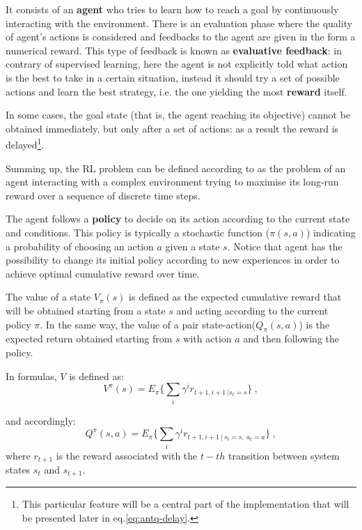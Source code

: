 \documentclass[10pt]{article}
\begin{document}
It consists of an  \textbf{agent}  who tries to learn how to reach a goal by continuously interacting with  the environment. 
There is an evaluation phase where the quality of agent's actions is considered and feedbacks to the agent are given in the form a numerical reward. 
This type of feedback is known as \textbf{evaluative feedback}: in contrary of supervised learning, here the agent is not explicitly told what action is the best to take in a  certain  situation, instead it should try a set of possible actions and learn the best strategy, i.e. the one yielding the most \textbf{reward} itself.  

In some cases, the goal state (that is, the agent reaching its objective) cannot be obtained immediately, but only after a set of actions: as a result the reward is delayed\footnote{This particular feature will be a central part of the implementation that will be presented later in eq.\ref{eq:antq-delay}.}. 

Summing up, the  RL  problem  can  be  defined according to \cite{diciotto} as  the  problem  of  an agent  interacting  with  a  complex environment trying to maximise its long-run reward over a sequence of discrete time steps.

The agent follows a \textbf{policy} to decide on its action according to the current state and conditions. 
This policy is typically a  stochastic  function ($\pi(s,a)$) indicating a probability  of  choosing an action $a$ given a state $s$.
Notice that agent has the possibility to change its initial policy  according  to  new experiences  in order to  achieve  optimal cumulative  reward  over  time.  

The  value  of  a  state $V_\pi(s)$  is  defined  as  the  expected  cumulative reward that  will  be  obtained starting from a state $s$ and acting according to the current policy $\pi$. 
In the same way, the value of  a pair state-action($Q_\pi(s,a)$) is  the  expected  return  obtained starting  from  $s$  with  action $a$  and  then following  the policy. 

In formulas, $V$ is defined as:
\begin{equation}
V^\pi(s)=E_\pi \{ \sum_i \gamma^i r_{t+1, i+1 ~ | s_t=s } \}~,
\end{equation}

and accordingly:
\begin{equation}
Q^\pi(s,a)=E_\pi \{ \sum_i \gamma^i r_{t+1, i+1 ~|~ s_t=s,~ a_t=a } \}~,
\end{equation}
where $r_{t+1}$ is the reward associated with the $t-th$ transition between system states $s_t$ and $s_{t+1}$.
\end{document}
